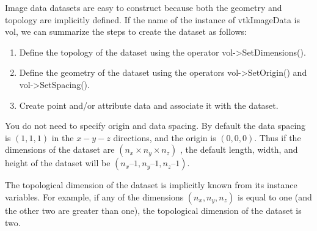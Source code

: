 Image data datasets are easy to construct because both the geometry and topology are implicitly defined. If the name of the instance of vtkImageData is vol, we can summarize the steps to create the dataset as follows:

\begin{enumerate}

	\item Define the topology of the dataset using the operator vol->SetDimensions().

	\item Define the geometry of the dataset using the operators vol->SetOrigin() and vol->SetSpacing().

	\item Create point and/or attribute data and associate it with the dataset.

\end{enumerate}

You do not need to specify origin and data spacing. By default the data spacing is $(1,1,1)$ in the $x-y-z$ directions, and the origin is $(0,0,0)$. Thus if the dimensions of the dataset are $(n_x \times n_y \times n_z)$ , the default length, width, and height of the dataset will be $(n_x – 1, n_y – 1, n_z – 1)$.

The topological dimension of the dataset is implicitly known from its instance variables. For example, if any of the dimensions $(n_x, n_y, n_z)$ is equal to one (and the other two are greater than one), the topological dimension of the dataset is two.

